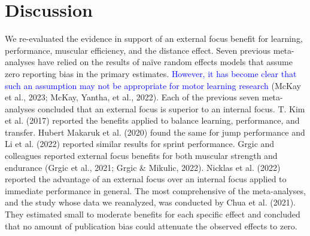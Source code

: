 \documentclass[
  man, donotrepeattitle,floatsintext]{apa7}
\begin{document}
\clearpage

\hypertarget{discussion}{%
\section{Discussion}\label{discussion}}

We re-evaluated the evidence in support of an external focus benefit for learning, performance, muscular efficiency, and the distance effect. Seven previous meta-analyses have relied on the results of naïve random effects models that assume zero reporting bias in the primary estimates. \textcolor{blue}{However, it has become clear that such an assumption may not be appropriate for motor learning research} (McKay et al., 2023; McKay, Yantha, et al., 2022). Each of the previous seven meta-analyses concluded that an external focus is superior to an internal focus. T. Kim et al. (2017) reported the benefits applied to balance learning, performance, and transfer. Hubert Makaruk et al. (2020) found the same for jump performance and Li et al. (2022) reported similar results for sprint performance. Grgic and colleagues reported external focus benefits for both muscular strength and endurance (Grgic et al., 2021; Grgic \& Mikulic, 2022). Nicklas et al. (2022) reported the advantage of an external focus over an internal focus applied to immediate performance in general. The most comprehensive of the meta-analyses, and the study whose data we reanalyzed, was conducted by Chua et al. (2021). They estimated small to moderate benefits for each specific effect and concluded that no amount of publication bias could attenuate the observed effects to zero.
\end{document}
